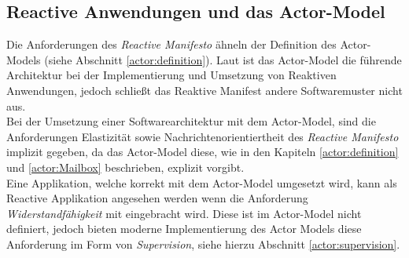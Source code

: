 \subsection{Reactive Anwendungen und das Actor-Model}
Die Anforderungen des \textit{Reactive Manifesto} ähneln der Definition des Actor-Models (siehe Abschnitt \ref{actor:definition}). Laut \cite{Vernon2015ReactiveAkka} ist das Actor-Model die führende Architektur bei der Implementierung und Umsetzung von Reaktiven Anwendungen, jedoch schließt das Reaktive Manifest andere Softwaremuster nicht aus. \\
Bei der Umsetzung einer Softwarearchitektur mit dem Actor-Model, sind die Anforderungen  Elastizität sowie  Nachrichtenorientiertheit des \textit{Reactive Manifesto} implizit gegeben, da das Actor-Model diese, wie in den Kapiteln \ref{actor:definition} und \ref{actor:Mailbox} beschrieben, explizit vorgibt.\\Eine Applikation, welche korrekt mit dem Actor-Model umgesetzt wird, kann als Reactive Applikation angesehen werden wenn die Anforderung \textit{Widerstandfähigkeit} mit eingebracht wird. Diese ist im Actor-Model nicht definiert, jedoch bieten moderne Implementierung des Actor Models diese Anforderung im Form von \textit{Supervision}, siehe hierzu Abschnitt \ref{actor:supervision}.
